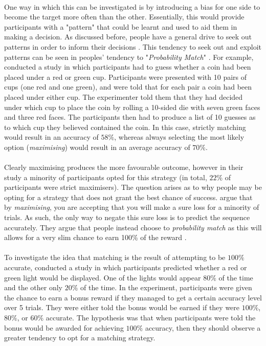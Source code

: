 \documentclass[12pt]{article}
\begin{document}
\paragraph{} One way in which this can be investigated is by introducing a bias for one side to become the target more often than the other. Essentially, this would provide participants with a "pattern" that could be learnt and used to aid them in making a decision. As discussed before, people have a general drive to seek out patterns in order to inform their decisions \citep{yellott1969probability}. This tendency to seek out and exploit patterns can be seen in peoples' tendency to "\textit{Probability Match}" \citep{Koehler2010}. For example, \cite{Koehler2010} conducted a study in which participants had to guess whether a coin had been placed under a red or green cup. Participants were presented with 10 pairs of cups (one red and one green), and were told that for each pair a coin had been placed under either cup. The experimenter told them that they had decided under which cup to place the coin by rolling a 10-sided die with seven green faces and three red faces. The participants then had to produce a list of 10 guesses as to which cup they believed contained the coin. In this case, strictly matching would result in an accuracy of $58\%$, whereas always selecting the most likely option (\textit{maximising}) would result in an average accuracy of $70\%$.  

\paragraph{} Clearly maximising produces the more favourable outcome, however in their study \citep{Koehler2010} a minority of participants opted for this strategy (in total, $22\%$ of participants were strict maximisers). The question arises as to why people may be opting for a strategy that does not grant the best chance of success. \cite{Gao2015} argue that by \textit{maximising}, you are accepting that you will make a sure loss for a minority of trials. As such, the only way to negate this sure loss is to predict the sequence accurately. They argue that people instead choose to \textit{probability match} as this will allows for a very slim chance to earn 100\% of the reward \citep{Gao2015}. 

\paragraph{} To investigate the idea that matching is the result of attempting to be $100\%$ accurate, \cite{Gao2015} conducted a study in which participants predicted whether a red or green light would be displayed. One of the lights would appear $80\%$ of the time and the other only $20\%$ of the time. In the experiment, participants were given the chance to earn a bonus reward if they managed to get a certain accuracy level over 5 trials. They were either told the bonus would be earned if they were $100\%$, $80\%$, or $60\%$ accurate. The hypothesis was that when participants were told the bonus would be awarded for achieving $100\%$ accuracy, then they should observe a greater tendency to opt for a matching strategy. 
\end{document}
